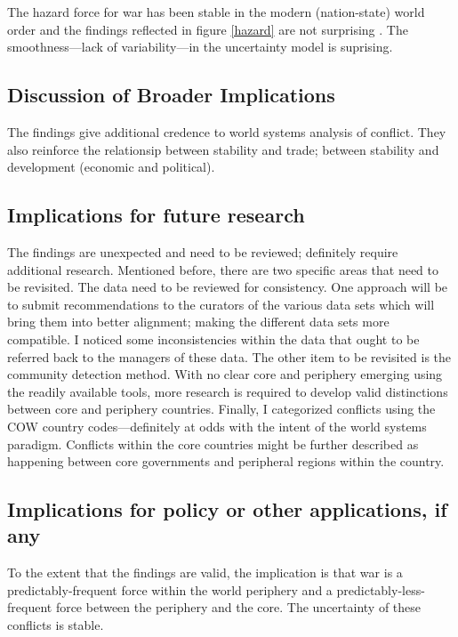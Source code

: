 \documentclass[pdftex,12pt]{article}
\begin{document}
The hazard force for war has been stable in the modern (nation-state) world order and the findings reflected in figure \ref{hazard} are not surprising \parencite[123-124]{Cioffi-Revilla1998}.  
The smoothness---lack of variability---in the uncertainty model is suprising. 

\subsection{Discussion of Broader Implications}
The findings give additional credence to world systems analysis of conflict.
They also reinforce the relationsip between stability and trade; between stability and development (economic and political).

\subsection{Implications for future research}
The findings are unexpected and need to be reviewed; definitely require additional research. 
Mentioned before, there are two specific areas that need to be revisited.
The data need to be reviewed for consistency. 
One approach will be to submit recommendations to the curators of the various data sets which will bring them into better alignment; making the different data sets more compatible.
I noticed some inconsistencies within the data that ought to be referred back to the managers of these data.
The other item to be revisited is the community detection method. 
With no clear core and periphery emerging using the readily available tools, more research is required to develop valid distinctions between core and periphery countries.
Finally, I categorized conflicts using the COW country codes---definitely at odds with the intent of the world systems paradigm.
Conflicts within the core countries might be further described as happening between core governments and peripheral regions within the country.

\subsection{Implications for policy or other applications, if any}
To the extent that the findings are valid, the implication is that war is a predictably-frequent force within the world periphery and a predictably-less-frequent force between the periphery and the core.
The uncertainty of these conflicts is stable.
\end{document}
